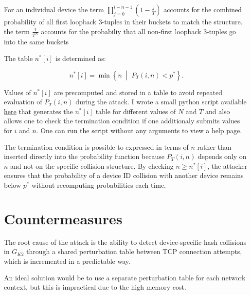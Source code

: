 \documentclass[twocolumn]{report}
\begin{document}
For an individual device the term $\prod_{j=0}^{i - n - 1} \left(1 - \frac{j}{T}\right)$ accounts for the combined probability of all first loopback 3-tuples in their buckets to match the structure.
 the term $\frac{1}{T^N}$ accounts for the probabiliy that all non-first loopback 3-tuples go into the same buckets

The table \( n^*[i] \) is determined as:

\begin{minipage}{\columnwidth}
  \[
n^*[i]
=
\min
\left\{
n
\;\middle|\;
P_T(i, n)
<
p^*
\right\}.
\]
\end{minipage}

Values of \( n^*[i] \) are \alert{precomputed} and stored in a table to avoid repeated evaluation of \( P_T(i, n) \) during the attack. I wrote a small \alert{python script} available \href{https://github.com/matthejue/Seminar-Device-Tracking/blob/main/phase2_termination_condition.py}{here} that generates the \( n^*[i] \) table for different values of $N$ and $T$ and also allows one to check the termination condition if one additionaly submits values for $i$ and $n$. One can run the script without any arguments to view a help page.

The termination condition is possible to expressed in terms of \( n \) rather than inserted directly into the probability function because \( P_T(i, n) \) depends only on \( n \) and \alert{not on the specific collision structure}. By checking \( n \ge n^*[i] \), the attacker ensures that the probability of a device ID collision with another device remains below \( p^* \) \alert{without recomputing probabilities} each time.

\vspace{0.2cm}


\section{Countermeasures}
\label{sec:countermeasures}

The \alert{root cause} of the attack is the ability to detect device-specific hash collisions in $G_{K2}$ through a shared perturbation table between TCP connection attempts, which is incremented in a predictable way.

An \alert{ideal solution} would be to use a separate perturbation table for each network context, but this is impractical due to the high memory cost.%
\end{document}
